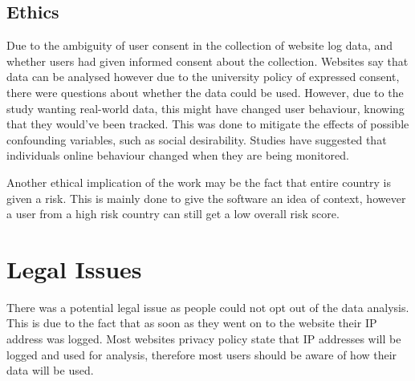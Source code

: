 \subsection{Ethics}
Due to the ambiguity of user consent in the collection of website log data, and whether users had given informed consent about the collection. Websites say that data can be analysed however due to the university policy of expressed consent, there were questions about whether the data could be used. However, due to the study wanting real-world data, this might have changed user behaviour, knowing that they would've been tracked. This was done to mitigate the effects of possible confounding variables, such as social desirability. Studies have suggested that individuals online behaviour changed when they are being monitored.

Another ethical implication of the work may be the fact that  entire country is given a risk. This is mainly done to give the software an idea of context, however a user from a high risk country can still get a low overall risk score.

\section{Legal Issues}
There was a potential legal issue as people could not opt out of the data analysis. This is due to the fact that as soon as they went on to the website their IP address was logged. Most websites privacy policy state that IP addresses will be logged and used for analysis, therefore most users should be aware of how their data will be used.